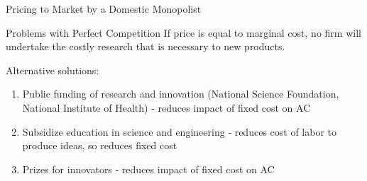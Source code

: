 \documentclass[notes,11pt, aspectratio=169, xcolor=table]{beamer}
\newenvironment{wideitemize}{\itemize\addtolength{\itemsep}{10pt}}{\enditemize}
\begin{document}
\begin{frame}{Pricing to Market by a Domestic Monopolist}

 \end{frame}




\begin{frame}{Problems with Perfect Competition}
\Large If price is equal to marginal cost, no firm will undertake the costly research that is
necessary to new products.
\vspace{20pt}

\normalsize

\begin{wideitemize}
    \item Alternative solutions:
    \begin{enumerate}
        \item Public funding of research and innovation (National Science Foundation, National Institute of Health) ‐ reduces impact of fixed cost on AC
        \item Subsidize education in science and engineering ‐ reduces cost of labor to produce ideas, so reduces fixed cost
        \item Prizes for innovators ‐ reduces impact of fixed cost on AC
    \end{enumerate}
\end{wideitemize}
    
\end{frame}
\end{document}
